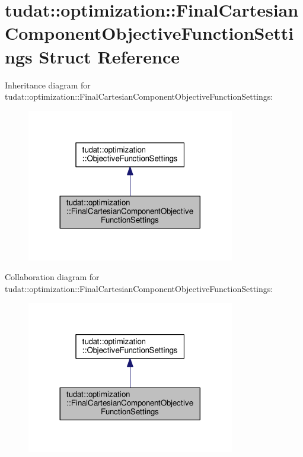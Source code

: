 \hypertarget{structtudat_1_1optimization_1_1FinalCartesianComponentObjectiveFunctionSettings}{}\section{tudat\+:\+:optimization\+:\+:Final\+Cartesian\+Component\+Objective\+Function\+Settings Struct Reference}
\label{structtudat_1_1optimization_1_1FinalCartesianComponentObjectiveFunctionSettings}


Inheritance diagram for tudat\+:\+:optimization\+:\+:Final\+Cartesian\+Component\+Objective\+Function\+Settings\+:
\nopagebreak
\begin{figure}[H]
\begin{center}
\leavevmode
\includegraphics[width=257pt]{structtudat_1_1optimization_1_1FinalCartesianComponentObjectiveFunctionSettings__inherit__graph}
\end{center}
\end{figure}


Collaboration diagram for tudat\+:\+:optimization\+:\+:Final\+Cartesian\+Component\+Objective\+Function\+Settings\+:
\nopagebreak
\begin{figure}[H]
\begin{center}
\leavevmode
\includegraphics[width=257pt]{structtudat_1_1optimization_1_1FinalCartesianComponentObjectiveFunctionSettings__coll__graph}
\end{center}
\end{figure}
